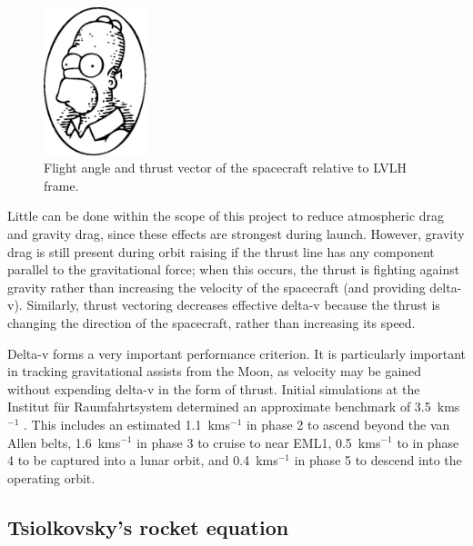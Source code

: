 \begin{figure}
\caption{Flight angle and thrust vector of the spacecraft relative to LVLH frame.}
\label{fig:path-angles}
\centering
\includegraphics[width=30mm]{Images/homer_simpson.pdf}
\end{figure}

Little can be done within the scope of this project to reduce atmospheric drag and gravity drag, since these effects are strongest during launch. However, gravity drag is still present during orbit raising if the thrust line has any component parallel to the gravitational force; when this occurs, the thrust is fighting against gravity rather than increasing the velocity of the spacecraft (and providing delta-v). Similarly, thrust vectoring decreases effective delta-v because the thrust is changing the direction of the spacecraft, rather than increasing its speed. 
 
Delta-v forms a very important performance criterion. It is particularly important in tracking gravitational assists from the Moon, as velocity may be gained without expending delta-v in the form of thrust. Initial simulations at the Institut f\"{u}r Raumfahrtsystem determined an approximate benchmark of 3.5~kms$^{-1}$ \parencite{Roeser2006}. This includes an estimated 1.1~kms$^{-1}$ in phase 2 to ascend beyond the van Allen belts, 1.6~kms$^{-1}$ in phase 3 to cruise to near EML1, 0.5~kms$^{-1}$ to in phase 4 to be captured into a lunar orbit, and 0.4~kms$^{-1}$ in phase 5 to descend into the operating orbit.

\subsection{Tsiolkovsky's rocket equation} \label{sec:Tsiolkovsky}

